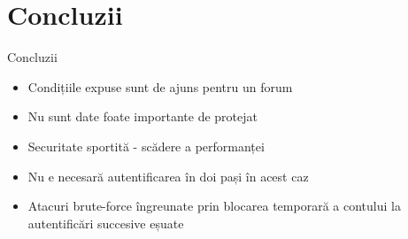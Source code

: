 \documentclass[9pt]{beamer}
\begin{document}
\section[]{Concluzii}

\begin{frame}{Concluzii}
	\begin{itemize}
	    \item Condițiile expuse sunt de ajuns pentru un forum
	    \vskip10pt
	    \item Nu sunt date foate importante de protejat
	    \vskip10pt
	    \item Securitate sportită - scădere a performanței
	    \vskip10pt
	    \item Nu e necesară autentificarea în doi pași în acest caz
	    \vskip10pt
	    \item Atacuri brute-force îngreunate prin blocarea temporară a contului la autentificări succesive eșuate
    \end{itemize}
\end{frame}
\end{document}
